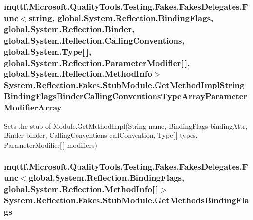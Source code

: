 \hypertarget{class_system_1_1_reflection_1_1_fakes_1_1_stub_module_af51a0d10e50a55b61d59bec4088057c3}{
\subsubsection[{Get\-Method\-Impl\-String\-Binding\-Flags\-Binder\-Calling\-Conventions\-Type\-Array\-Parameter\-Modifier\-Array}]{\setlength{\rightskip}{0pt plus 5cm}mqttf.\-Microsoft.\-Quality\-Tools.\-Testing.\-Fakes.\-Fakes\-Delegates.\-Func$<$string, global.\-System.\-Reflection.\-Binding\-Flags, global.\-System.\-Reflection.\-Binder, global.\-System.\-Reflection.\-Calling\-Conventions, global.\-System.\-Type\mbox{[}$\,$\mbox{]}, global.\-System.\-Reflection.\-Parameter\-Modifier\mbox{[}$\,$\mbox{]}, global.\-System.\-Reflection.\-Method\-Info$>$ System.\-Reflection.\-Fakes.\-Stub\-Module.\-Get\-Method\-Impl\-String\-Binding\-Flags\-Binder\-Calling\-Conventions\-Type\-Array\-Parameter\-Modifier\-Array}}\label{class_system_1_1_reflection_1_1_fakes_1_1_stub_module_af51a0d10e50a55b61d59bec4088057c3}


Sets the stub of Module.\-Get\-Method\-Impl(\-String name, Binding\-Flags binding\-Attr, Binder binder, Calling\-Conventions call\-Convention, Type\mbox{[}$\,$\mbox{]} types, Parameter\-Modifier\mbox{[}$\,$\mbox{]} modifiers)

\hypertarget{class_system_1_1_reflection_1_1_fakes_1_1_stub_module_abb6eaeeb3cdc32213f287cf392f0868a}{
\subsubsection[{Get\-Methods\-Binding\-Flags}]{\setlength{\rightskip}{0pt plus 5cm}mqttf.\-Microsoft.\-Quality\-Tools.\-Testing.\-Fakes.\-Fakes\-Delegates.\-Func$<$global.\-System.\-Reflection.\-Binding\-Flags, global.\-System.\-Reflection.\-Method\-Info\mbox{[}$\,$\mbox{]}$>$ System.\-Reflection.\-Fakes.\-Stub\-Module.\-Get\-Methods\-Binding\-Flags}}\label{class_system_1_1_reflection_1_1_fakes_1_1_stub_module_abb6eaeeb3cdc32213f287cf392f0868a}


